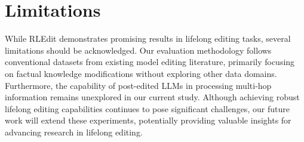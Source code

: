 \section{Limitations}
While RLEdit demonstrates promising results in lifelong editing tasks, several limitations should be acknowledged. Our evaluation methodology follows conventional datasets from existing model editing literature, primarily focusing on factual knowledge modifications without exploring other data domains. Furthermore, the capability of post-edited LLMs in processing multi-hop information remains unexplored in our current study. Although achieving robust lifelong editing capabilities continues to pose significant challenges, our future work will extend these experiments, potentially providing valuable insights for advancing research in lifelong editing.